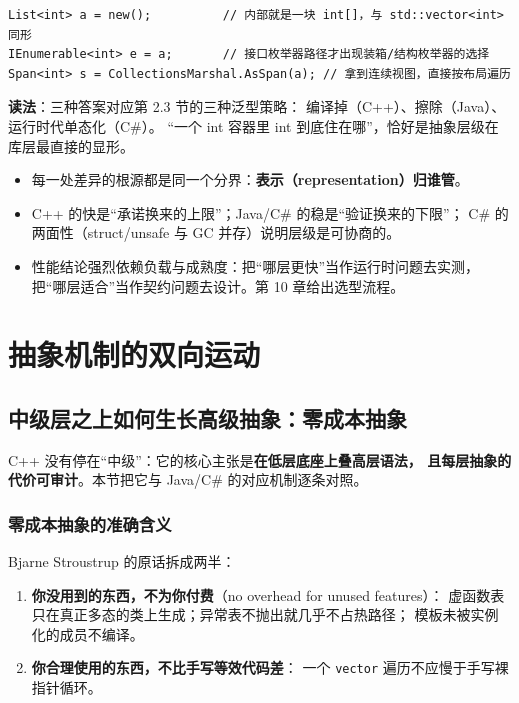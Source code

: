 \documentclass[12pt,a4paper,fontset=fandol]{ctexbook}
\begin{document}
\begin{lstlisting}[style=csharpstyle,caption={C\#：泛型 reified，值类型免装箱}]
List<int> a = new();          // 内部就是一块 int[]，与 std::vector<int> 同形
IEnumerable<int> e = a;       // 接口枚举器路径才出现装箱/结构枚举器的选择
Span<int> s = CollectionsMarshal.AsSpan(a); // 拿到连续视图，直接按布局遍历
\end{lstlisting}

\textbf{读法}：三种答案对应第 2.3 节的三种泛型策略：
编译掉（C++）、擦除（Java）、运行时代单态化（C\#）。
``一个 int 容器里 int 到底住在哪''，恰好是抽象层级在库层最直接的显形。

\begin{guideline}[title=四个实验的共同读法]
\begin{itemize}
  \item 每一处差异的根源都是同一个分界：\textbf{表示（representation）归谁管}。
  \item C++ 的快是``承诺换来的上限''；Java/C\# 的稳是``验证换来的下限''；
        C\# 的两面性（struct/unsafe 与 GC 并存）说明层级是可协商的。
  \item 性能结论强烈依赖负载与成熟度：把``哪层更快''当作运行时问题去实测，
        把``哪层适合''当作契约问题去设计。第 10 章给出选型流程。
\end{itemize}
\end{guideline}

\part{抽象机制的双向运动}

\chapter{中级层之上如何生长高级抽象：零成本抽象}

C++ 没有停在``中级''：它的核心主张是\textbf{在低层底座上叠高层语法，
且每层抽象的代价可审计}。本节把它与 Java/C\# 的对应机制逐条对照。

\section{零成本抽象的准确含义}

Bjarne Stroustrup 的原话拆成两半：

\begin{enumerate}
  \item \textbf{你没用到的东西，不为你付费}（no overhead for unused features）：
        虚函数表只在真正多态的类上生成；异常表不抛出就几乎不占热路径；
        模板未被实例化的成员不编译。
  \item \textbf{你合理使用的东西，不比手写等效代码差}：
        一个 \texttt{vector} 遍历不应慢于手写裸指针循环。
\end{enumerate}
\end{document}
